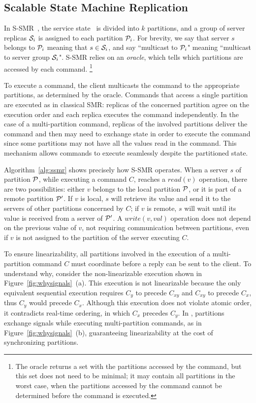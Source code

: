 \subsection{Scalable State Machine Replication}

In S-SMR~\cite{bezerra2014ssmr}, the service state \vvt\ is divided into $k$ partitions, and a group of server replicas $\mathcal{S}_i$ is assigned to each partition $\mathcal{P}_i$. For brevity, we say that server $s$ belongs to $\mathcal{P}_i$ meaning that $s \in \mathcal{S}_i$, and say ``multicast to $\mathcal{P}_i$" meaning ``multicast to server group $\mathcal{S}_i$".
S-SMR relies on an \emph{oracle}, which tells which partitions are accessed by each command.%
\footnote{The oracle returns a set with the partitions accessed by the command, but this set does not need to be minimal; it may contain all partitions in the worst case, when the partitions accessed by the command cannot be determined before the command is executed.}

To execute a command, the client multicasts the command to the appropriate partitions, as determined by the oracle.
Commands that access a single partition are executed as in classical SMR: replicas of the concerned partition agree on the execution order and each replica executes the command independently.
In the case of a multi-partition command, replicas of the involved partitions deliver the command and then may need to exchange state in order to execute the command since some partitions may not have all the values read in the command.
This mechanism allows commands to execute seamlessly despite the partitioned state.



Algorithm~\ref{alg:ssmr} shows precisely how S-SMR operates. When a server $s$ of partition $\mathcal{P}$, while executing a command $C$, reaches a $read(v)$ operation, there are two possibilities:
either $v$ belongs to the local partition $\mathcal{P}$,
or it is part of a remote partition $\mathcal{P}'$. 
If $v$ is local, $s$ will retrieve its value and send it to the servers of other partitions concerned by $C$;
if $v$ is remote, $s$ will wait until its value is received from a server of $\mathcal{P}'$. 
A $write(v, val)$ operation does not depend on the previous value of $v$, not requiring communication between partitions, even if $v$ is not assigned to the partition of the server executing $C$.

\pagebreak

To ensure linearizability, all partitions involved in the execution of a multi-partition command $C$ must coordinate before a reply can be sent to the client.
To understand why, consider the non-linearizable execution shown in Figure~\ref{fig:whysignals}~(a).
This execution is not linearizable because the only equivalent sequential execution requires $C_y$ to precede $C_{xy}$ and $C_{xy}$ to precede $C_x$, thus $C_y$ would precede $C_x$.
Although this execution does not violate atomic order, it contradicts real-time ordering, in which $C_x$ precedes $C_y$.
In \ssmr{}, partitions exchange signals while executing multi-partition commands, as in Figure~\ref{fig:whysignals}~(b), guaranteeing linearizability at the cost of synchronizing partitions.

